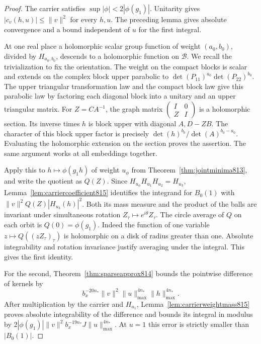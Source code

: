 \documentclass[a4paper,11pt]{article}
\theoremstyle{definition}
\theoremstyle{remark}
\numberwithin{equation}{section}
\begin{document}
\begin{proof}
The carrier satisfies \(\sup|\phi|<2|\phi(g_1)|\).
Unitarity gives \(|c_v(h,u)|\le\|v\|^2\) for every \(h,u\).
The preceding lemma gives absolute convergence and a bound
independent of \(u\) for the first integral.

At one real place a holomorphic scalar group function of
weight \((a_0,b_0)\), divided by \(H_{a_0,b_0}\), descends
to a holomorphic function on \(\mathcal B\). We recall
the trivialization to fix the orientation. The weight on the
compact blocks is scalar and extends on the complex block
upper parabolic to \(\det(P_{11})^{a_0}\det(P_{22})^{b_0}\).
The upper triangular transformation law and the compact
block law give this parabolic law by factoring each
diagonal block into a unitary and an upper triangular
matrix. For \(Z=CA^{-1}\), the graph matrix
\(\left(\begin{smallmatrix}I&0\\ Z&I\end{smallmatrix}\right)\)
is a holomorphic section. Its inverse times \(h\) is
block upper with diagonal \(A,D-ZB\).
The character of this block upper factor is precisely
\(\det(h)^{b_0}/\det(A)^{b_0-a_0}\). Evaluating the
holomorphic extension on the section proves the assertion.
The same argument works at all embeddings together.

Apply this to \(h\mapsto\phi(g_1h)\) of weight \(u_\phi\)
from Theorem~\ref{thm:jointminima813}, and write the quotient
as \(Q(Z)\). Since \(H_{u_\phi}H_{u_1}H_{u_2}=H_{u_3}\),
Lemma~\ref{lem:carriercoefficient815} identifies the
integrand for \(B_0(1)\) with
\(\|v\|^2 Q(Z)|H_{u_3}(h)|^2\).
Both its mass measure and the product of the balls are
invariant under simultaneous rotation \(Z_\tau\mapsto
e^{i\theta}Z_\tau\). The circle average of \(Q\) on
each orbit is \(Q(0)=\phi(g_1)\). Indeed the function of
one variable \(z\mapsto Q((zZ_\tau)_\tau)\) is holomorphic
on a disk of radius greater than one. Absolute integrability
and rotation invariance justify averaging under the integral.
This gives the first identity.

For the second, Theorem~\ref{thm:sparseapprox814} bounds
the pointwise difference of kernels by
\[
 b_x^{-20n_*}\|v\|^2\|u\|_{\max}^{4n_*}\|h\|_{\max}^{4n_*}.
\]
After multiplication by the carrier and \(H_{u_1}\),
Lemma~\ref{lem:carrierweightmass815} proves absolute
integrability of the difference and bounds its integral
in modulus by
\(2|\phi(g_1)|\|v\|^2 b_x^{-19n_*}J\|u\|_{\max}^{4n_*}\).
At \(u=1\) this error is strictly smaller than \(|B_0(1)|\).


\end{proof}
\end{document}
